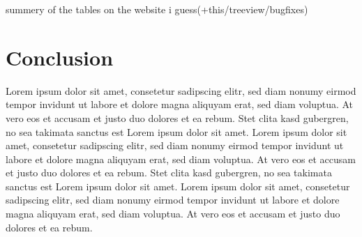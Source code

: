 \documentclass{vgtc}                          %
\begin{document}
summery of the tables on the website i guess(+this/treeview/bugfixes)

\section{Conclusion}

Lorem ipsum dolor sit amet, consetetur sadipscing elitr, sed diam
nonumy eirmod tempor invidunt ut labore et dolore magna aliquyam erat,
sed diam voluptua. At vero eos et accusam et justo duo dolores et ea
rebum. Stet clita kasd gubergren, no sea takimata sanctus est Lorem
ipsum dolor sit amet. Lorem ipsum dolor sit amet, consetetur
sadipscing elitr, sed diam nonumy eirmod tempor invidunt ut labore et
dolore magna aliquyam erat, sed diam voluptua. At vero eos et accusam
et justo duo dolores et ea rebum. Stet clita kasd gubergren, no sea
takimata sanctus est Lorem ipsum dolor sit amet. Lorem ipsum dolor sit
amet, consetetur sadipscing elitr, sed diam nonumy eirmod tempor
invidunt ut labore et dolore magna aliquyam erat, sed diam
voluptua. At vero eos et accusam et justo duo dolores et ea
rebum.

%

%
%
%


\end{document}
